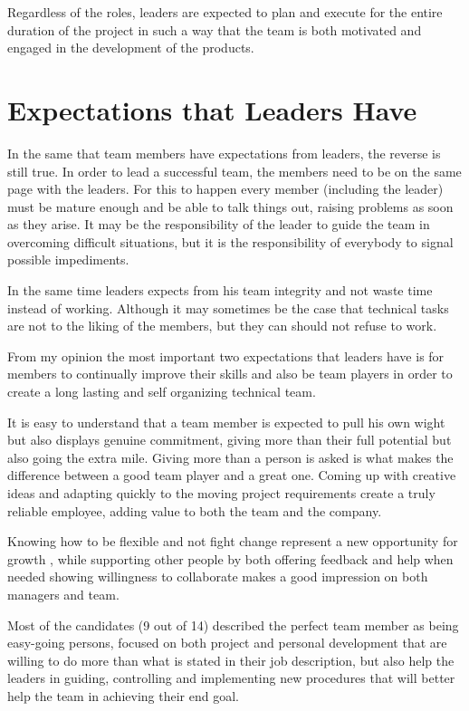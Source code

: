 Regardless of the roles, leaders are expected to plan and execute for the entire duration of the project in such a way that the team is both motivated and engaged in the development of the products.

\section{Expectations that Leaders Have}
\label{sec:byleaders}
In the same that team members have expectations from leaders, the reverse is still true. In order to lead a successful team, the members need to be on the same page with the leaders. For this to happen every member (including the leader) must be mature enough and be able to talk things out, raising problems as soon as they arise. It may be the responsibility of the leader to guide the team in overcoming difficult situations, but it is the responsibility of everybody to signal possible impediments.

In the same time leaders expects from his team integrity and not waste time instead of working. Although it may sometimes be the case that technical tasks are not to the liking of the members, but they can should not refuse to work. 

From my opinion the most important two expectations that leaders have is for members to continually improve their skills and also be team players in order to create a long lasting and self organizing technical team.

It is easy to understand that a team member is expected to pull his own wight but also displays genuine commitment, giving more than their full potential but also going the extra mile. Giving more than a person is asked is what makes the difference between a good team player and a great one. Coming up with creative ideas and adapting quickly to the moving project requirements create a truly reliable employee, adding value to both the team and the company.

Knowing how to be flexible and not fight change represent a new opportunity for growth , while supporting other people by both offering feedback and help when needed showing willingness to collaborate makes a good impression on both managers and team.

Most of the candidates (9 out of 14) described the perfect team member as being easy-going persons, focused on both project and personal development that are willing to do more than what is stated in their job description, but also help the leaders in guiding, controlling and implementing new procedures that will better help the team in achieving their end goal.

